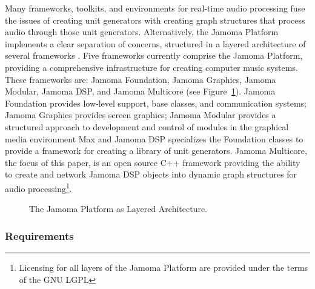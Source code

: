 \documentclass[twoside,a4paper]{article}
\begin{document}
Many frameworks, toolkits, and environments for real-time audio processing fuse the issues of creating unit generators with creating graph structures that process audio through those unit generators.  
Alternatively, the Jamoma Platform implements a clear separation of concerns, structured in a layered architecture of several frameworks \cite{Place:2010}.
 Five frameworks currently comprise the Jamoma Platform, providing a comprehensive infrastructure for creating computer music systems. 
 These frameworks are: Jamoma Foundation, Jamoma Graphics, Jamoma Modular, Jamoma DSP, and Jamoma Multicore (see Figure~\ref{fig:layers}). 
 Jamoma Foundation provides low-level support, base classes, and communication systems; Jamoma Graphics provides screen graphics; Jamoma Modular provides a structured approach to development and control of modules in the graphical media environment Max \cite{Place:2006} and Jamoma DSP specializes the Foundation classes to provide a framework for creating a library of unit generators. 
 Jamoma Multicore, the focus of this paper, is an open source C++ framework providing the ability to create and network Jamoma DSP objects into dynamic graph structures for audio processing\footnote{Licensing for all layers of the Jamoma Platform are provided under the terms of the GNU LGPL}.  


\begin{figure}[htbp]
\centerline{}
\caption{The Jamoma Platform as Layered Architecture.}
\label{fig:layers}
\end{figure}


\subsubsection{Requirements}
\end{document}
